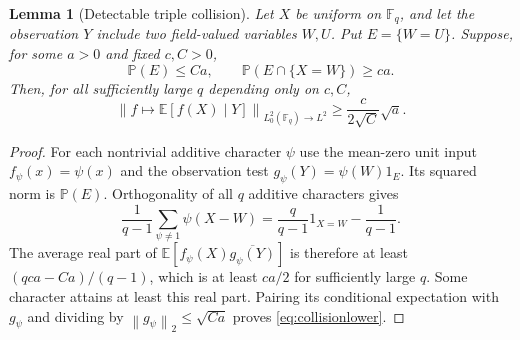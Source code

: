 \documentclass[11pt,a4paper]{article}
\numberwithin{equation}{section}
\newtheorem{lemma}[theorem]{Lemma}
\theoremstyle{definition}
\theoremstyle{remark}
\newcommand{\E}{\mathbb E}
\newcommand{\F}{\mathbb F}
\newcommand{\Prob}{\mathbb P}
\newcommand{\norm}[1]{\left\lVert #1\right\rVert}
\begin{document}
\begin{lemma}[Detectable triple collision]
\label{lem:collision}
Let $X$ be uniform on $\F_q$, and let the observation $Y$ include
two field-valued variables $W,U$. Put $E=\{W=U\}$.
Suppose, for some $a>0$ and fixed $c,C>0$,
\[
 \Prob(E)\le Ca,\qquad \Prob(E\cap\{X=W\})\ge ca.
\]
Then, for all sufficiently large $q$ depending only on $c,C$,
\begin{equation}
 \norm{f\mapsto\E[f(X)\mid Y]}_{L^2_0(\F_q)\to L^2}
 \ge\frac{c}{2\sqrt C}\sqrt a.
 \label{eq:collisionlower}
\end{equation}
\end{lemma}
\begin{proof}
For each nontrivial additive character $\psi$ use the mean-zero unit
input $f_\psi(x)=\psi(x)$ and the observation test
$g_\psi(Y)=\psi(W)1_E$. Its squared norm is $\Prob(E)$.
Orthogonality of all $q$ additive characters gives
\[
 \frac1{q-1}\sum_{\psi\ne1}\psi(X-W)
 =\frac q{q-1}1_{X=W}-\frac1{q-1}.
\]
The average real part of
$\E[f_\psi(X)\overline{g_\psi(Y)}]$ is therefore at least
$(qca-Ca)/(q-1)$, which is at least $ca/2$ for sufficiently large
$q$. Some character attains at least this real part. Pairing its
conditional expectation with $g_\psi$ and dividing by
$\norm{g_\psi}_2\le\sqrt{Ca}$ proves \eqref{eq:collisionlower}.
\end{proof}
\end{document}
